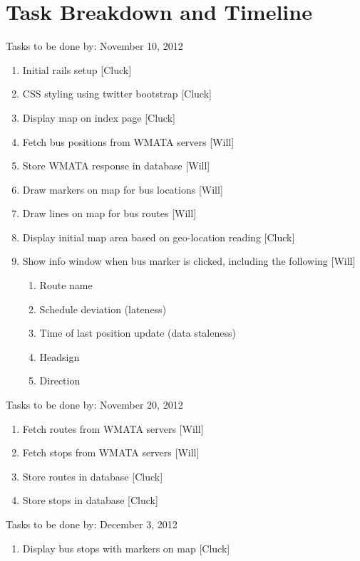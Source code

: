\documentclass[12pt]{report}
\begin{document}
\chapter{Task Breakdown and Timeline}
\begin{description}
  \item Tasks to be done by:  November 10, 2012   
  
  \begin{enumerate}
    \item Initial rails setup [Cluck]
    \item CSS styling using twitter bootstrap [Cluck]
    \item Display map on index page [Cluck]
    \item Fetch bus positions from WMATA servers [Will]
    \item Store WMATA response in database [Will]
    \item Draw markers on map for bus locations [Will]
    \item Draw lines on map for bus routes [Will]
    \item Display initial map area based on geo-location reading [Cluck]
    \item Show info window when bus marker is clicked, including the following [Will]
    \begin{enumerate}
      \item Route name
      \item Schedule deviation (lateness)
      \item Time of last position update (data staleness)
      \item Headsign
      \item Direction
    \end{enumerate}
  \end{enumerate}
  \item Tasks to be done by: November 20, 2012
  \begin{enumerate}
    \item Fetch routes from WMATA servers [Will]
    \item Fetch stops from WMATA servers [Will]
    \item Store routes in database [Cluck]
    \item Store stops in database [Cluck]
  \end{enumerate}
  \item Tasks to be done by: December 3, 2012
  \begin{enumerate}
    \item Display bus stops with markers on map [Cluck]

\end{enumerate}
\end{description}
\end{document}
